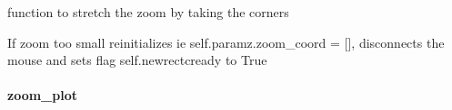 \documentclass[letterpaper,10pt,openany,oneside]{sphinxmanual}
\begin{document}
\begin{fulllineitems}
\begin{fulllineitems}
\end{fulllineitems}


\begin{fulllineitems}
\label{rst/visu2d:Visu.zooming.ZOOMING.stretchrect}
function to stretch the zoom by taking the corners

\end{fulllineitems}


\begin{fulllineitems}
\label{rst/visu2d:Visu.zooming.ZOOMING.zoom_check_size}
If zoom too small reinitializes ie self.paramz.zoom\_coord = {[}{]}, disconnects the mouse
and sets flag self.newrectcready to True

\end{fulllineitems}


\end{fulllineitems}



\paragraph{zoom\_plot}
\label{rst/visu2d:module-Visu.zoom_plot}\label{rst/visu2d:zoom-plot}
\end{document}
